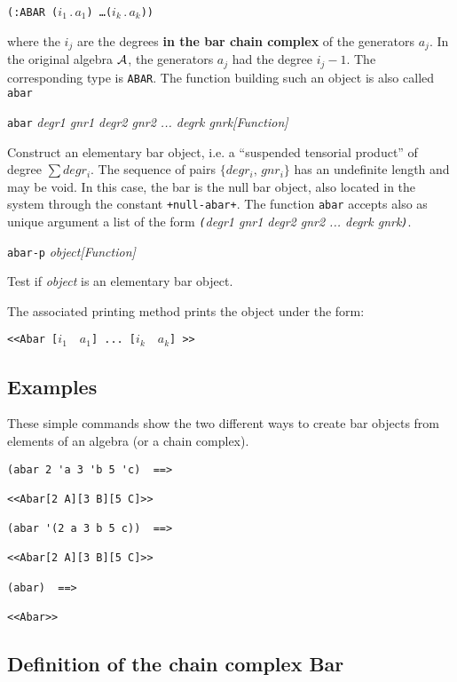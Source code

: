 \begin{center} {\tt (:ABAR  ($i_1\, . \, a_1$) \ldots ($i_k\, . \, a_k$))} \end{center}
where the $i_j$ are the degrees {\bf in the bar chain complex} of the generators $a_j$.
In the original algebra $\cal A$, the generators $a_j$ had the degree $i_j-1$.
The corresponding type is {\tt ABAR}.
The function  building such an object is also called {\tt abar}
\vskip 0.35cm
{\parindent=0mm
{\leftskip=5mm
{\tt abar} {\em  degr1 gnr1 degr2 gnr2 ... degrk gnrk}\hfill {\em [Function]} \par}
{\leftskip=15mm
Construct an elementary bar object, i.e. a ``suspended tensorial product'' of degree $\sum degr_i$. The sequence of pairs
$\lbrace degr_i,\,  gnr_i \rbrace$ has an undefinite length and  may be void. In this case,  the bar
is the null bar object, also located in the system through the constant {\tt +null-abar+}. The function
{\tt abar} accepts also as unique argument a list of the form
{\em  {\tt (}degr1 gnr1 degr2 gnr2 ... degrk gnrk{\tt )}}.   \par}
{\leftskip=5mm
{\tt abar-p} {\em object}\hfill {\em [Function]} \par}
{\leftskip=15mm
Test if {\em object} is an elementary bar object. \par}
}
\vskip 0.35cm
The associated printing  method prints the object under the form:
\begin{center}
{\tt <<Abar [$i_1\quad a_1$] ... [$i_k\quad a_k$] >>}
\end{center}

\subsection* {Examples}

These simple commands show the two different ways to create bar objects
from elements of an algebra (or a chain complex).
{\footnotesize\begin{verbatim}
(abar 2 'a 3 'b 5 'c)  ==>

<<Abar[2 A][3 B][5 C]>>

(abar '(2 a 3 b 5 c))  ==>

<<Abar[2 A][3 B][5 C]>>

(abar)  ==>

<<Abar>>
\end{verbatim}}

\subsection {Definition of the chain complex Bar}

